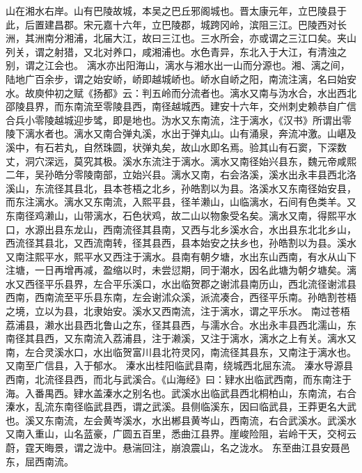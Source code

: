 \documentclass[12pt,UTF8]{ctexbook}
\begin{document}
山在湘水右岸。山有巴陵故城，本吴之巴丘邪阁城也。晋太康元年，立巴陵县于此，后置建昌郡。宋元嘉十六年，立巴陵郡，城跨冈岭，滨阻三江。巴陵西对长洲，其洲南分湘浦，北届大江，故曰三江也。三水所会，亦或谓之三江口矣。夹山列关，谓之射猎，又北对养口，咸湘浦也。水色青异，东北入于大江，有清浊之别，谓之江会也。
漓水亦出阳海山，漓水与湘水出一山而分源也。湘、漓之间，陆地广百余步，谓之始安峤，峤即越城峤也。峤水自峤之阳，南流注漓，名曰始安水。故庾仲初之赋《扬都》云：判五岭而分流者也。漓水又南与沩水合，水出西北邵陵县界，而东南流至零陵县西，南径越城西。建安十六年，交州刺史赖恭自广信合兵小零陵越城迎步骘，即是地也。沩水又东南流，注于漓水，《汉书》所谓出零陵下漓水者也。漓水又南合弹丸溪，水出于弹丸山。山有涌泉，奔流冲激。山嵁及溪中，有石若丸，自然珠圆，状弹丸矣，故山水即名焉。验其山有石窦，下深数丈，洞穴深远，莫究其极。溪水东流注于漓水。漓水又南径始兴县东，魏元帝咸熙二年，吴孙皓分零陵南部，立始兴县。漓水又南，右会洛溪，溪水出永丰县西北洛溪山，东流径其县北，县本苍梧之北乡，孙皓割以为县。洛溪水又东南径始安县，而东注漓水。漓水又东南流，入熙平县，径羊濑山，山临漓水，石间有色类羊。又东南径鸡濑山，山带漓水，石色状鸡，故二山以物象受名矣。漓水又南，得熙平水口，水源出县东龙山，西南流径其县南，又西与北乡溪水合，水出县东北北乡山，西流径其县北，又西流南转，径其县西，县本始安之扶乡也，孙皓割以为县。溪水又南注熙平水，熙平水又西注于漓水。县南有朝夕塘，水出东山西南，有水从山下注塘，一日再增再减，盈缩以时，未尝愆期，同于潮水，因名此塘为朝夕塘矣。漓水又西径平乐县界，左合平乐溪口，水出临贺郡之谢沭县南历山，西北流径谢沭县西南，西南流至平乐县东南，左会谢沭众溪，派流凑合，西径平乐南。孙皓割苍梧之境，立以为县，北隶始安。溪水又西南流，注于漓水，谓之平乐水。
南过苍梧荔浦县，濑水出县西北鲁山之东，径其县西，与濡水合。水出永丰县西北濡山，东南径其县西，又东南流入荔浦县，注于濑溪，又注于漓水，漓水之上有关。漓水又南，左合灵溪水口，水出临贺富川县北符灵冈，南流径其县东，又南注于漓水也。又南至广信县，入于郁水。
溱水出桂阳临武县南，绕城西北屈东流。
溱水导源县西南，北流径县西，而北与武溪合。《山海经》曰：肄水出临武西南，而东南注于海。入番禺西。肄水盖溱水之别名也。武溪水出临武县西北桐柏山，东南流，右合溱水，乱流东南径临武县西，谓之武溪。县侧临溪东，因曰临武县，王莽更名大武也。溪又东南流，左会黄岑溪水，水出郴县黄岑山，西南流，右合武溪水。武溪水又南入重山，山名蓝豪，广圆五百里，悉曲江县界。崖峻险阻，岩岭干天，交柯云蔚，霆天晦景，谓之泷中。悬湍回注，崩浪震山，名之泷水。
东至曲江县安聂邑东，屈西南流。
\end{document}
